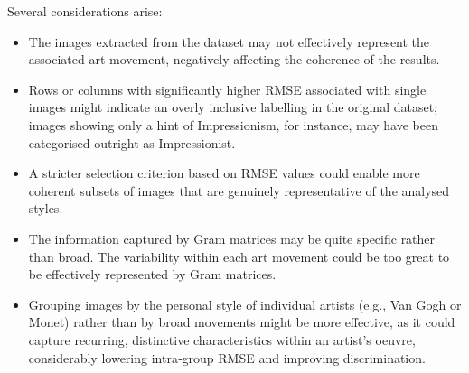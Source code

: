 \documentclass[a4paper,11pt]{article}
\begin{document}
Several considerations arise:
\begin{itemize}
\item The images extracted from the dataset may not effectively represent the associated art movement, negatively affecting the coherence of the results.
\item Rows or columns with significantly higher RMSE associated with single images might indicate an overly inclusive labelling in the original dataset; images showing only a hint of Impressionism, for instance, may have been categorised outright as Impressionist.
\item A stricter selection criterion based on RMSE values could enable more coherent subsets of images that are genuinely representative of the analysed styles.
\item The information captured by Gram matrices may be quite specific rather than broad. The variability within each art movement could be too great to be effectively represented by Gram matrices.
\item Grouping images by the personal style of individual artists (e.g., Van Gogh or Monet) rather than by broad movements might be more effective, as it could capture recurring, distinctive characteristics within an artist’s oeuvre, considerably lowering intra‑group RMSE and improving discrimination.
\end{itemize}

\printbibliography
\end{document}
